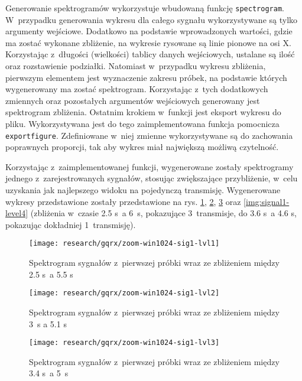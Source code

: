 Generowanie spektrogramów wykorzystuje wbudowaną funkcję \texttt{spectrogram}. W~przypadku generowania wykresu dla
całego sygnału wykorzystywane są tylko argumenty wejściowe. Dodatkowo na podstawie wprowadzonych wartości, gdzie ma
zostać wykonane zbliżenie, na wykresie rysowane są linie pionowe na osi X. Korzystając z~długości (wielkości) tablicy
danych wejściowych, ustalane są ilość oraz rozstawienie podziałki. Natomiast w~przypadku wykresu zbliżenia, pierwszym
elementem jest wyznaczenie zakresu próbek, na podstawie których wygenerowany ma zostać spektrogram. Korzystając z~tych
dodatkowych zmiennych oraz pozostałych argumentów wejściowych generowany jest spektrogram zbliżenia. Ostatnim krokiem
w~funkcji jest eksport wykresu do pliku. Wykorzystywana jest do tego zaimplementowana funkcja pomocnicza
\texttt{exportfigure}. Zdefiniowane w~niej zmienne wykorzystywane są do zachowania poprawnych proporcji, tak aby wykres
miał największą możliwą czytelność.

\FloatBarrier
Korzystając z~zaimplementowanej funkcji, wygenerowane zostały spektrogramy jednego z~zarejestrowanych sygnałów, stosując
zwiększające przybliżenie, w~celu uzyskania jak najlepszego widoku na pojedynczą transmisję. Wygenerowane wykresy
przedstawione zostały przedstawione na rys. \ref{img:signal1-level1}, \ref{img:signal1-level2}, \ref{img:signal1-level3}
oraz \ref{img:signal1-level4} (zbliżenia w~czasie 2.5 s~a 6~s, pokazujące 3~transmisje, do 3.6 s~a 4.6 s, pokazując
dokładniej 1~transmisję).

\begin{figure}[!htbp]
    \centering
    \texttt{[image: research/gqrx/zoom-win1024-sig1-lvl1]}
    \caption{\label{img:signal1-level1}Spektrogram sygnałów z~pierwszej próbki wraz ze zbliżeniem między 2.5 s~a 5.5 s}
\end{figure}

\begin{figure}[!htbp]
    \centering
    \texttt{[image: research/gqrx/zoom-win1024-sig1-lvl2]}
    \caption{\label{img:signal1-level2}Spektrogram sygnałów z~pierwszej próbki wraz ze zbliżeniem między 3~s a 5.1 s}
\end{figure}

\begin{figure}[!htbp]
    \centering
    \texttt{[image: research/gqrx/zoom-win1024-sig1-lvl3]}
    \caption{\label{img:signal1-level3}Spektrogram sygnałów z~pierwszej próbki wraz ze zbliżeniem między 3.4 s~a 5~s}
\end{figure}

